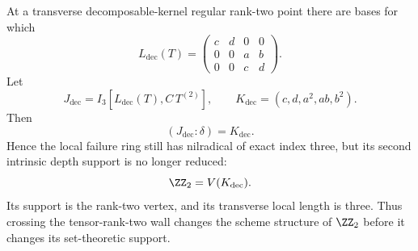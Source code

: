 \begin{theorem}
\label{thm:decomposable-kernel-wall}
At a transverse decomposable-kernel regular rank-two point there are
bases for which
\begin{equation}\label{eq:decomposable-linear-block}
 L_{\mathrm{dec}}(T)=
 \begin{pmatrix}
 c&d&0&0\\
 0&0&a&b\\
 0&0&c&d
 \end{pmatrix}.
\end{equation}
Let
\[
 J_{\mathrm{dec}}
 =I_3[L_{\mathrm{dec}}(T),C\,T^{(2)}],\qquad
 K_{\mathrm{dec}}=(c,d,a^2,ab,b^2).
\]
Then
\begin{equation}\label{eq:decomposable-colon}
 (J_{\mathrm{dec}}:\delta)=K_{\mathrm{dec}}.
\end{equation}
Hence the local failure ring still has nilradical of exact index three,
but its second intrinsic depth support is no longer reduced:
\begin{equation}\label{eq:decomposable-Z2}
 \ZZ_2
 =
 V(K_{\mathrm{dec}}).
\end{equation}
Its support is the rank-two vertex, and its transverse local length is
three.  Thus crossing the tensor-rank-two wall changes the
scheme structure of \(\ZZ_2\) before it changes its set-theoretic
support.
\end{theorem}

